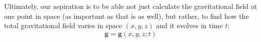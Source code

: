 Ultimately, our aspiration is to be able not just calculate the gravitational
field at one point in space (as important as that is as well), but rather, to
find how the total gravitational field varies in space $(x,y,z)$ and it evolves
in time $t$:
\begin{equation*}
  \bm g=\bm g(x,y,z;t)
\end{equation*}




